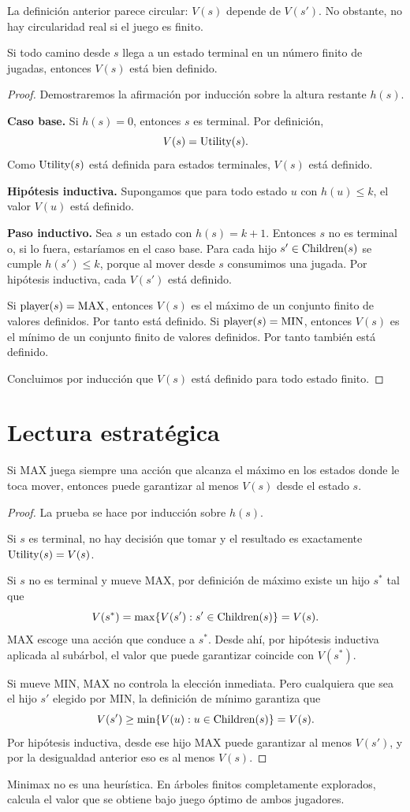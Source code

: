 La definición anterior parece circular: $V(s)$ depende de $V(s')$. No obstante, no hay circularidad real si el juego es finito.

\begin{theorem}
Si todo camino desde $s$ llega a un estado terminal en un número finito de jugadas, entonces $V(s)$ está bien definido.
\end{theorem}

\begin{proof}
Demostraremos la afirmación por inducción sobre la altura restante $h(s)$.

\textbf{Caso base.} Si $h(s)=0$, entonces $s$ es terminal. Por definición,
\[
V(s)=\operatorname{Utility}(s).
\]
Como $\operatorname{Utility}(s)$ está definida para estados terminales, $V(s)$ está definido.

\textbf{Hipótesis inductiva.} Supongamos que para todo estado $u$ con $h(u)\le k$, el valor $V(u)$ está definido.

\textbf{Paso inductivo.} Sea $s$ un estado con $h(s)=k+1$. Entonces $s$ no es terminal o, si lo fuera, estaríamos en el caso base. Para cada hijo $s'\in\operatorname{Children}(s)$ se cumple $h(s')\le k$, porque al mover desde $s$ consumimos una jugada. Por hipótesis inductiva, cada $V(s')$ está definido.

Si $\operatorname{player}(s)=\mathrm{MAX}$, entonces $V(s)$ es el máximo de un conjunto finito de valores definidos. Por tanto está definido. Si $\operatorname{player}(s)=\mathrm{MIN}$, entonces $V(s)$ es el mínimo de un conjunto finito de valores definidos. Por tanto también está definido.

Concluimos por inducción que $V(s)$ está definido para todo estado finito.
\end{proof}

\section{Lectura estratégica}

\begin{proposition}
Si MAX juega siempre una acción que alcanza el máximo en los estados donde le toca mover, entonces puede garantizar al menos $V(s)$ desde el estado $s$.
\end{proposition}

\begin{proof}
La prueba se hace por inducción sobre $h(s)$.

Si $s$ es terminal, no hay decisión que tomar y el resultado es exactamente $\operatorname{Utility}(s)=V(s)$.

Si $s$ no es terminal y mueve MAX, por definición de máximo existe un hijo $s^*$ tal que
\[
V(s^*)=\max\{V(s'):s'\in\operatorname{Children}(s)\}=V(s).
\]
MAX escoge una acción que conduce a $s^*$. Desde ahí, por hipótesis inductiva aplicada al subárbol, el valor que puede garantizar coincide con $V(s^*)$.

Si mueve MIN, MAX no controla la elección inmediata. Pero cualquiera que sea el hijo $s'$ elegido por MIN, la definición de mínimo garantiza que
\[
V(s')\ge \min\{V(u):u\in\operatorname{Children}(s)\}=V(s).
\]
Por hipótesis inductiva, desde ese hijo MAX puede garantizar al menos $V(s')$, y por la desigualdad anterior eso es al menos $V(s)$.
\end{proof}

\begin{summarybox}
Minimax no es una heurística. En árboles finitos completamente explorados, calcula el valor que se obtiene bajo juego óptimo de ambos jugadores.
\end{summarybox}
